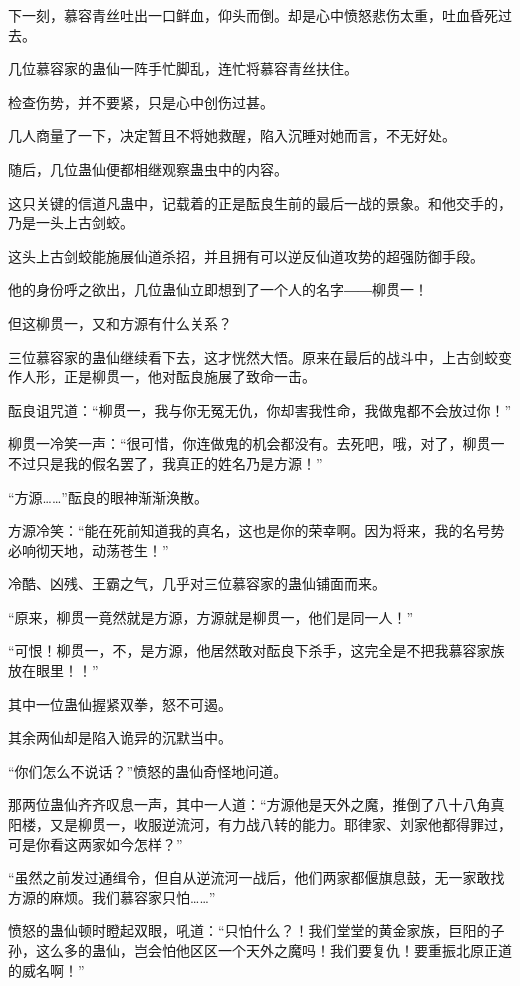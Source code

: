 \begin{this_body}
下一刻，慕容青丝吐出一口鲜血，仰头而倒。却是心中愤怒悲伤太重，吐血昏死过去。

几位慕容家的蛊仙一阵手忙脚乱，连忙将慕容青丝扶住。

检查伤势，并不要紧，只是心中创伤过甚。

几人商量了一下，决定暂且不将她救醒，陷入沉睡对她而言，不无好处。

随后，几位蛊仙便都相继观察蛊虫中的内容。

这只关键的信道凡蛊中，记载着的正是酝良生前的最后一战的景象。和他交手的，乃是一头上古剑蛟。

这头上古剑蛟能施展仙道杀招，并且拥有可以逆反仙道攻势的超强防御手段。

他的身份呼之欲出，几位蛊仙立即想到了一个人的名字――柳贯一！

但这柳贯一，又和方源有什么关系？

三位慕容家的蛊仙继续看下去，这才恍然大悟。原来在最后的战斗中，上古剑蛟变作人形，正是柳贯一，他对酝良施展了致命一击。

酝良诅咒道：“柳贯一，我与你无冤无仇，你却害我性命，我做鬼都不会放过你！”

柳贯一冷笑一声：“很可惜，你连做鬼的机会都没有。去死吧，哦，对了，柳贯一不过只是我的假名罢了，我真正的姓名乃是方源！”

“方源……”酝良的眼神渐渐涣散。

方源冷笑：“能在死前知道我的真名，这也是你的荣幸啊。因为将来，我的名号势必响彻天地，动荡苍生！”

冷酷、凶残、王霸之气，几乎对三位慕容家的蛊仙铺面而来。

“原来，柳贯一竟然就是方源，方源就是柳贯一，他们是同一人！”

“可恨！柳贯一，不，是方源，他居然敢对酝良下杀手，这完全是不把我慕容家族放在眼里！！”

其中一位蛊仙握紧双拳，怒不可遏。

其余两仙却是陷入诡异的沉默当中。

“你们怎么不说话？”愤怒的蛊仙奇怪地问道。

那两位蛊仙齐齐叹息一声，其中一人道：“方源他是天外之魔，推倒了八十八角真阳楼，又是柳贯一，收服逆流河，有力战八转的能力。耶律家、刘家他都得罪过，可是你看这两家如今怎样？”

“虽然之前发过通缉令，但自从逆流河一战后，他们两家都偃旗息鼓，无一家敢找方源的麻烦。我们慕容家只怕……”

愤怒的蛊仙顿时瞪起双眼，吼道：“只怕什么？！我们堂堂的黄金家族，巨阳的子孙，这么多的蛊仙，岂会怕他区区一个天外之魔吗！我们要复仇！要重振北原正道的威名啊！”


\end{this_body}
